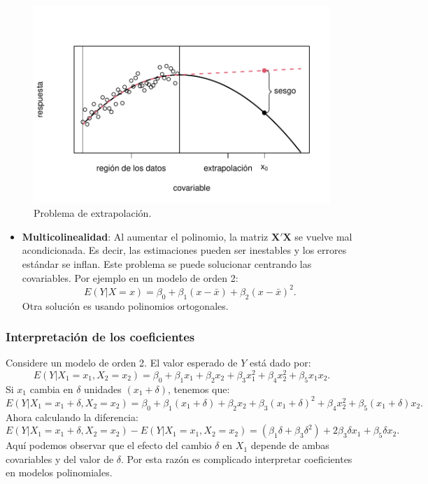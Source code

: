 \documentclass[
]{article}
\providecommand{\tightlist}{%
  \setlength{\itemsep}{0pt}\setlength{\parskip}{0pt}}
\begin{document}
\begin{figure}

{\centering \includegraphics{MLG2_files/figure-latex/extrapolacion-1} 

}

\caption{Problema de extrapolación.}\label{fig:extrapolacion}
\end{figure}

\begin{itemize}
\tightlist
\item
  \textbf{Multicolinealidad}: Al aumentar el polinomio, la matriz \(\boldsymbol X'\boldsymbol X\) se vuelve mal acondicionada. Es decir, las estimaciones pueden ser inestables y los errores estándar se inflan. Este problema se puede solucionar centrando las covariables. Por ejemplo en un modelo de orden 2:
  \[
  E(Y | X=x) = \beta_{0} + \beta_{1}(x-\bar{x}) + \beta_{2}(x-\bar{x})^{2}.
  \]
  Otra solución es usando polinomios ortogonales.
\end{itemize}

\hypertarget{interpretaciuxf3n-de-los-coeficientes}{%
\subsubsection{Interpretación de los coeficientes}\label{interpretaciuxf3n-de-los-coeficientes}}

Considere un modelo de orden 2. El valor esperado de \(Y\) está dado por:
\[
E(Y| X_{1}=x_1,X_{2}=x_2) = \beta_{0} + \beta_{1}x_{1} + \beta_{2}x_{2} + \beta_{3}x_{1}^{2} + \beta_{4}x_{2}^{2} + \beta_{5}x_{1}x_{2}.
\]
Si \(x_{1}\) cambia en \(\delta\) unidades \((x_{1} + \delta)\), tenemos que:
\[
E(Y| X_{1}=x_1+\delta,X_{2}=x_2) =  \beta_{0} + \beta_{1}(x_{1}+\delta) + \beta_{2}x_{2} + \beta_{3}(x_{1} + \delta)^{2} + \beta_{4}x_{2}^{2} + \beta_{5}(x_{1}+\delta)x_{2}.
\]
Ahora calculando la diferencia:
\[
E(Y| X_{1}=x_1+\delta,X_{2}=x_2) - E(Y| X_{1}=x_1,X_{2}=x_2) = (\beta_{1}\delta + \beta_{3}\delta^{2}) + 2\beta_{3}\delta x_{1} + \beta_{5}\delta x_{2}.
\]
Aquí podemos observar que el efecto del cambio \(\delta\) en \(X_1\) depende de ambas covariables y del valor de \(\delta\). Por esta razón es complicado interpretar coeficientes en modelos polinomiales.
\end{document}
